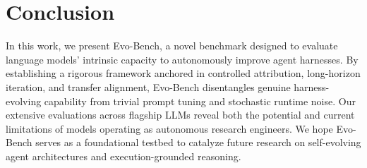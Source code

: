 \section{Conclusion}
In this work, we present Evo-Bench, a novel benchmark designed to evaluate language models' intrinsic capacity to autonomously improve agent harnesses. By establishing a rigorous framework anchored in controlled attribution, long-horizon iteration, and transfer alignment, Evo-Bench disentangles genuine harness-evolving capability from trivial prompt tuning and stochastic runtime noise. Our extensive evaluations across flagship LLMs reveal both the potential and current limitations of models operating as autonomous research engineers. We hope Evo-Bench serves as a foundational testbed to catalyze future research on self-evolving agent architectures and execution-grounded reasoning.